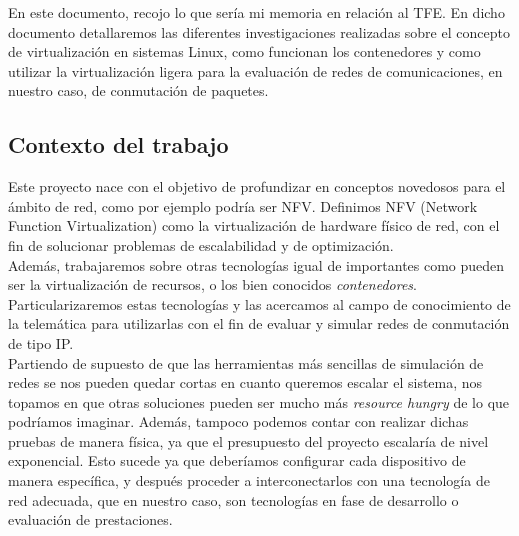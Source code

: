 \documentclass[12pt]{article}
\begin{document}
	\noindent En este documento, recojo lo que sería mi memoria en relación al TFE. En dicho documento detallaremos las diferentes investigaciones realizadas sobre el concepto de virtualización en sistemas Linux, como funcionan los contenedores y como utilizar la virtualización ligera para la evaluación de redes de comunicaciones, en nuestro caso, de conmutación de paquetes.
	
	\subsection{Contexto del trabajo}
	\noindent Este proyecto nace con el objetivo de profundizar en conceptos novedosos para el ámbito de red, como por ejemplo podría ser NFV. Definimos NFV (Network Function Virtualization) como la virtualización de hardware físico de red, con el fin de solucionar problemas de escalabilidad y de optimización.\\
	
	 \noindent Además, trabajaremos sobre otras tecnologías igual de importantes como pueden ser la virtualización de recursos, o los bien conocidos \textit{contenedores}. Particularizaremos estas tecnologías y las acercamos al campo de conocimiento de la telemática para utilizarlas con el fin de evaluar y simular redes de conmutación de tipo IP. \\
	
	\noindent Partiendo de supuesto de que las herramientas más sencillas de simulación de redes se nos pueden quedar cortas en cuanto queremos escalar el sistema, nos topamos en que otras soluciones pueden ser mucho más \textit{resource hungry} de lo que podríamos imaginar. Además, tampoco podemos contar con realizar dichas pruebas de manera física, ya que el presupuesto del proyecto escalaría de nivel exponencial. Esto sucede ya que deberíamos configurar cada dispositivo de manera específica, y después proceder a interconectarlos con una tecnología de red adecuada, que en nuestro caso, son tecnologías en fase de desarrollo o evaluación de prestaciones.\\
	
	
\end{document}
